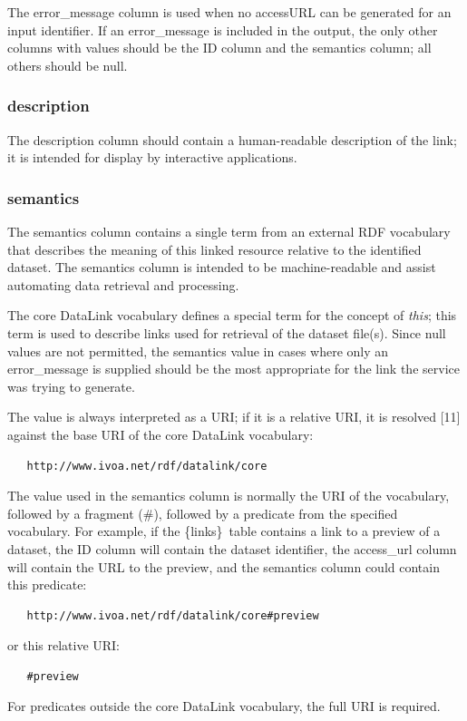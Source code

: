 \documentclass[11pt,a4paper]{ivoa}
\newcommand{\blinks}{\{links\}}
\begin{document}
The error\_message column is used when no accessURL can be generated for
an input identifier. If an error\_message is included in the output, the
only other columns with values should be the ID column and the semantics
column; all others should be null.


\subsubsection{description}

The description column should contain a human-readable description of
the link; it is intended for display by interactive applications.


\subsubsection{semantics}

The semantics column contains a single term from an external RDF
vocabulary that describes the meaning of this linked resource relative
to the identified dataset. The semantics column is intended to be
machine-readable and assist automating data retrieval and processing.

The core DataLink vocabulary defines a special term for
the concept of {\em this\/};
this term is used to describe links used for retrieval of the
dataset file(s). Since null values are not permitted, the semantics
value in cases where only an error\_message is supplied should be the
most appropriate for the link the service was trying to generate.

The value is always interpreted as a URI; if it is a relative URI,
it is resolved [11] against the base URI of the
core DataLink vocabulary:
\begin{verbatim}
   http://www.ivoa.net/rdf/datalink/core
\end{verbatim}

The value used in the semantics column is normally the URI of the
vocabulary, followed by a fragment (\#), followed by a predicate from
the specified vocabulary.  For example, if the \blinks\ table contains a
link to a preview of a dataset, the ID column will contain the dataset
identifier, the access\_url column will contain the URL to the preview,
and the semantics column could contain this predicate:
\begin{verbatim}
   http://www.ivoa.net/rdf/datalink/core#preview
\end{verbatim}
or this relative URI:
\begin{verbatim}
   #preview
\end{verbatim}
For predicates outside the core DataLink vocabulary,
the full URI is required.
\end{document}
